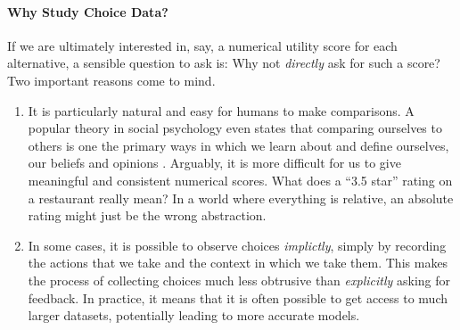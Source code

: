 \paragraph{Why Study Choice Data?}
If we are ultimately interested in, say, a numerical utility score for each alternative, a sensible question to ask is:
Why not \emph{directly} ask for such a score?
Two important reasons come to mind.
\begin{enumerate}
\item It is particularly natural and easy for humans to make comparisons.
A popular theory in social psychology even states that comparing ourselves to others is one the primary ways in which we learn about and define ourselves, our beliefs and opinions \citep{festinger1954theory}.
Arguably, it is more difficult for us to give meaningful and consistent numerical scores.
What does a ``3.5 star'' rating on a restaurant really mean?
In a world where everything is relative, an absolute rating might just be the wrong abstraction.

\item In some cases, it is possible to observe choices \emph{implictly}, simply by recording the actions that we take and the context in which we take them.
This makes the process of collecting choices much less obtrusive than \emph{explicitly} asking for feedback.
In practice, it means that it is often possible to get access to much larger datasets, potentially leading to more accurate models.
\end{enumerate}


